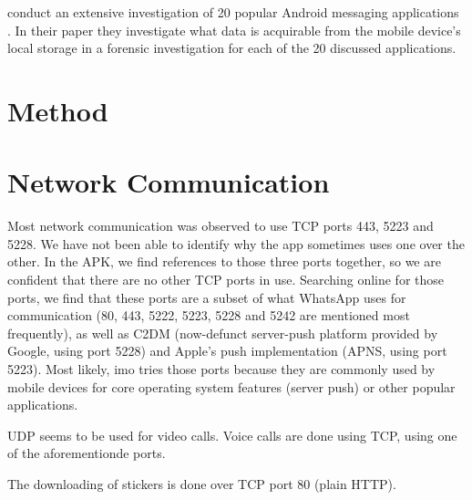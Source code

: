 \documentclass[conference]{IEEEtran}
\begin{document}
\citeauthor{walnycky2015network} conduct an extensive investigation of 20
popular Android messaging applications \cite{walnycky2015network}. In their
paper they investigate what data is acquirable from the mobile device's local
storage in a forensic investigation for each of the 20 discussed applications.





\section{Method}\label{sec:method}


\section{Network Communication}\label{sec:comm}

Most network communication was observed to use TCP ports 443, 5223 and 5228. We
have not been able to identify why the app sometimes uses one over the other.
In the APK, we find references to those three ports together, so we are
confident that there are no other TCP ports in use. Searching online for those
ports, we find that these ports are a subset of what WhatsApp uses for
communication (80, 443, 5222, 5223, 5228 and 5242 are mentioned most
frequently), as well as C2DM (now-defunct server-push platform provided by
Google, using port 5228) and Apple's push implementation (APNS, using port
5223). Most likely, imo tries those ports because they are commonly used by
mobile devices for core operating system features (server push) or other
popular applications.

UDP seems to be used for video calls. Voice calls are done using TCP, using one
of the aforementionde ports.

The downloading of stickers is done over TCP port 80 (plain HTTP).
\end{document}
